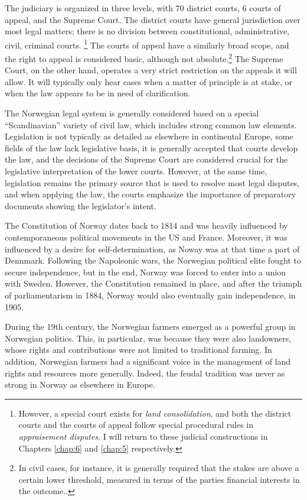 The judiciary is organized in three levels, with 70 district courts, 6 courts of appeal, and the Supreme Court. The district courts have general jurisdiction over most legal matters; there is no division between constitutional, administrative, civil, criminal courts. \footnote{However, a special court exists for {\it land consolidation}, and both the district courts and the courts of appeal follow special procedural rules in {\it appraisement disputes}. I will return to these judicial constructions in Chapters \ref{chap:6} and \ref{chap:5} respectively.} The courts of appeal have a similarly broad scope, and the right to appeal is considered basic, although not absolute.\footnote{In civil cases, for instance, it is generally required that the stakes are above a certain lower threshold, measured in terms of the parties financial interests in the outcome..}  The Supreme Court, on the other hand, operates a very strict restriction on the appeals it will allow. It will typically only hear cases when a matter of principle is at stake, or when the law appears to be in need of clarification.

The Norwegian legal system is generally considered based on a special ``Scandinavian'' variety of civil law, which includes strong common law elements. Legislation is not typically as detailed as elsewhere in continental Europe, some fields of the law lack legislative basis, it is generally accepted that courts develop the law, and the decisions of the Supreme Court are considered crucial for the legislative interpretation of the lower courts. However, at the same time, legislation remains the primary source that is used to resolve most legal disputes, and when applying the law, the courts emphasize the importance of preparatory documents showing the legislator's intent.

The Constitution of Norway dates back to 1814 and was heavily influenced by contemporaneous political movements in the US and France. Moreover, it was influenced by a desire for self-determination, as Noway was at that time a part of Dennmark. Following the Napoleonic wars, the Norwegian political elite fought to secure independence, but in the end, Norway was forced to enter into a union with Sweden. However, the Constitution remained in place, and after the triumph of parliamentarism in 1884, Norway would also eventually gain independence, in 1905. 

During the 19th century, the Norwegian farmers emerged as a powerful group in Norwegian politics. This, in particular, was because they were also landowners, whose rights and contributions were not limited to traditional farming. In addition, Norwegian farmers had a significant voice in the management of land rights and resources more generally. Indeed, the feudal tradition was never as strong in Norway as elsewhere in Europe. 

